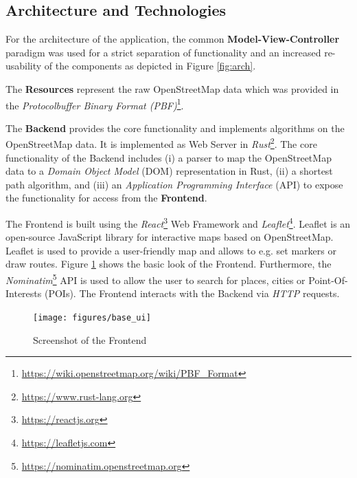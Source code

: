 \documentclass[a4paper]{article}
\begin{document}
\subsection{Architecture and Technologies}
For the architecture of the application, the common \textbf{Model-View-Controller} paradigm was used for a strict separation of functionality and an increased re-usability of the components as depicted in Figure \ref{fig:arch}.\par\medskip
The \textbf{Resources} represent the raw OpenStreetMap data which was provided in the \textit{Protocolbuffer Binary Format (PBF)}\footnote{\url{https://wiki.openstreetmap.org/wiki/PBF_Format}}.\par\medskip
The \textbf{Backend} provides the core functionality and implements algorithms on the OpenStreetMap data.
It is implemented as Web Server in \textit{Rust}\footnote{\url{https://www.rust-lang.org}}.
The core functionality of the Backend includes (i) a parser to map the OpenStreetMap data to a \textit{Domain Object Model} (DOM) representation in Rust,
(ii) a shortest path algorithm, and (iii) an \textit{Application Programming Interface} (API) to expose the functionality for access from the \textbf{Frontend}.\par\medskip
The Frontend is built using the \textit{React}\footnote{\url{https://reactjs.org}} Web Framework and \textit{Leaflet}\footnote{\url{https://leafletjs.com}}. Leaflet is an open-source JavaScript library for interactive maps based on OpenStreetMap.
Leaflet is used to provide a user-friendly map and allows to e.g. set markers or draw routes.
Figure \ref{fig:base_ui} shows the basic look of the Frontend.
Furthermore, the \textit{Nominatim}\footnote{\url{https://nominatim.openstreetmap.org}} API is used to allow the user to search for places, cities or Point-Of-Interests (POIs).
The Frontend interacts with the Backend via \textit{HTTP} requests.
\begin{figure}[h]
    \centering
    \texttt{[image: figures/base\_ui]}
    \caption{Screenshot of the Frontend}
    \label{fig:base_ui}
\end{figure}
\end{document}
